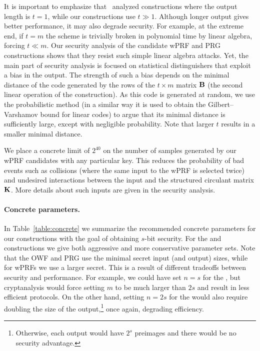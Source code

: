 It is important to emphasize that~\cite{cheon2020-adventures} analyzed constructions where the output length is $t=1$,
while our constructions use $t \gg 1$.
Although longer output gives better performance, it may also degrade security.
For example, at the extreme end, if $t = m$ the scheme is trivially broken in polynomial time by linear algebra,
forcing $t \ll m$.
Our security analysis of the candidate wPRF and PRG constructions shows that they resist such simple linear algebra attacks.
Yet, the main part of security analysis is focused on statistical distinguishers that exploit a bias in the output.
The strength of such a bias depends on the minimal distance of the
code generated by the rows of the $t \times m$ matrix $\mat{B}$
(the second linear operation of the construction).
As this code is generated at random, we use the probabilistic method
(in a similar way it is used to obtain the Gilbert–Varshamov bound for linear codes)
to argue that its minimal distance is sufficiently large, except with negligible probability.
Note that larger $t$ results in a smaller minimal distance.

We place a concrete limit of $2^{40}$ on the number of samples generated by our wPRF candidates
with any particular key. This reduces the probability of bad events such as collisions
(where the same input to the wPRF is selected twice) and undesired interactions
between the input and the structured circulant matrix $\mat{K}$.
More details about such inputs are given in the security analysis.


\paragraph{Concrete parameters.}
In Table~\ref{table:concrete} we summarize the recommended
concrete parameters for our constructions
with the goal of obtaining $s$-bit security. For the \ttOWF and \ttwPRF constructions
we give both aggressive and more conservative parameter sets.
Note that the OWF and PRG use the minimal secret input (and output)
sizes, while for wPRFs we use a larger secret.
This is a result of different tradeoffs between security and performance.
For example, we could have set $n = s$ for the \ttwPRF, but cryptanalysis would
force setting $m$ to be much larger than $2s$ and result in less efficient protocols.
On the other hand, setting $n = 2s$ for the \ttOWF would also require
doubling the size of the output,\footnote{
Otherwise, each output would have $2^s$ preimages and there would be no security advantage.}
once again, degrading efficiency.

